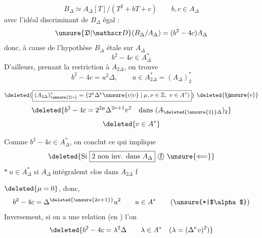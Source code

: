 \[
 B_\Delta\simeq A_\Delta[T]/(T^2+bT+c)\qquad b,c\in A_\Delta
\]
avec l'idéal discriminant de $B_\Delta$ égal :
\[
 \unsure{\mathfrak{D}|\mathscr D}(B_\Delta/A_\Delta)=(b^2-4c)A_\Delta
\]
donc, à cause de l'hypothèse $B_\Delta$ étale sur $A_\Delta$
\[
 b^2-4c\in A_\Delta^*
\]
D'ailleurs, prenant la restriction à $A_{2\Delta}$, on trouve
\[
 b^2-4c=u^2\Delta,\qquad u\in A_{2\Delta}^*=(A_\Delta)_2^*
\]

\[
 \deleted{\boxed{(A_{2\Delta})_{\unsure{2|*}}^*=\{2^\mu\Delta^\nu\unsure{v|\upsilon}\mid\mu,\nu\in\mathbb Z,\ v\in A^*)}}\ \deleted{\text{\textcircled{\unsure{e}}}}
\]
\[
 \deleted{b^2-4c=2^{2\mu}\Delta^{2\nu+1}v^2\quad\text{dans }(A_{\deleted{\unsure{2}}\Delta})_2}
\]
\[
 \deleted{v\in A^*}
\]

Comme $b^2-4c\in A_\Delta^*$, on conclut  ce qui implique
\[
 \deleted{\text{Si }\boxed{2\ \text{non inv. dans } A_\Delta}\ \text{\textcircled{f}}\ \unsure{\Longleftarrow}}
\]
$*\ u\in A_\Delta^*$ si $\boxed{A_\Delta\ \text{intégralemt clos dans } A_{2\Delta}}$ \textcircled{f}

$\deleted{\mu=0}$, donc,
\[
 b^2-4c=\Delta^{\deleted{\unsure{2\nu+1}}}u^2\qquad u\in A^* \tag*{(\unsure{*|$\alpha$})}
\]
Inversement, si on a une relation \unsure{$\alpha$|$(*)$} (en ) l'on 
\[
 \deleted{b^2-4c=\lambda^2\Delta\qquad\lambda\in A^*\quad(\lambda=(\Delta^\nu v)^{2})}
\]

